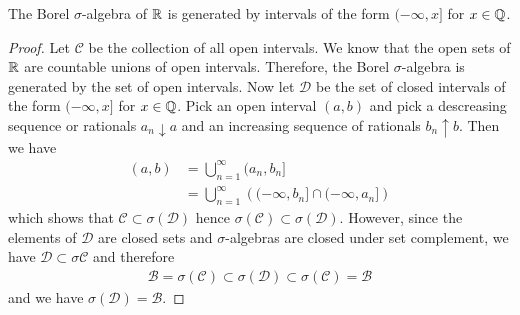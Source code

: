 \begin{lem}\label{IntervalsGenerateBorel}The Borel $\sigma$-algebra of $\mathbb{R}$ is generated by intervals
  of the form $(-\infty, x]$ for $x \in \mathbb{Q}$.
\end{lem}
\begin{proof}Let $\mathcal{C}$ be the collection of all open
  intervals.
We know that the open sets of $\mathbb{R}$ are countable
  unions of open intervals.  Therefore, the Borel $\sigma$-algebra is
  generated by the set of open intervals.  Now let $\mathcal{D}$ be
  the set of closed intervals of the form $(-\infty,x]$ for $x \in
  \mathbb{Q}$.  Pick an open interval
  $(a,b)$ and pick a descreasing sequence or rationals $a_n \downarrow
  a$ and an increasing sequence of rationals $b_n \uparrow b$.  Then
  we have 
\begin{align*}(a,b) &= \bigcup_{n=1}^\infty (a_n,b_n] \\
&= \bigcup_{n=1}^\infty \left ( (-\infty,b_n] \cap (-\infty,a_n] \right )
\end{align*}
which shows that $\mathcal{C} \subset \sigma(\mathcal{D})$ hence 
$\sigma(\mathcal{C}) \subset \sigma(\mathcal{D})$.  However, since the
elements of $\mathcal{D}$ are closed sets and $\sigma$-algebras are
closed under set complement, we have $\mathcal{D} \subset
\sigma{\mathcal{C}}$ and therefore
\begin{align*}
\mathcal{B} = \sigma(\mathcal{C}) \subset \sigma(\mathcal{D}) \subset
\sigma(\mathcal{C}) = \mathcal{B}
\end{align*}
and we have $\sigma(\mathcal{D}) = \mathcal{B}$.
\end{proof}

